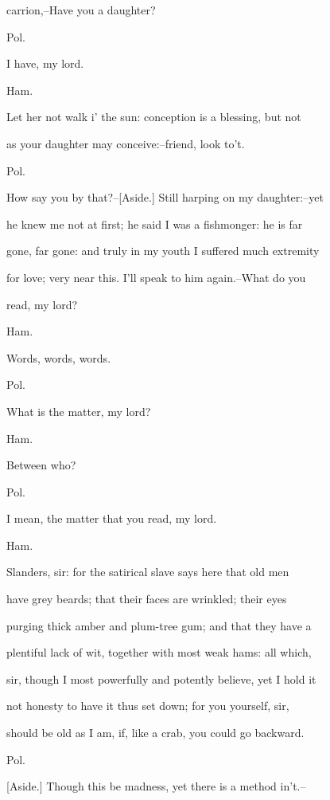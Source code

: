 \documentclass[12pt]{book}
\begin{document}
carrion,--Have you a daughter?



Pol.

I have, my lord.



Ham.

Let her not walk i' the sun: conception is a blessing, but not

as your daughter may conceive:--friend, look to't.



Pol.

How say you by that?--[Aside.] Still harping on my daughter:--yet

he knew me not at first; he said I was a fishmonger: he is far

gone, far gone: and truly in my youth I suffered much extremity

for love; very near this. I'll speak to him again.--What do you

read, my lord?



Ham.

Words, words, words.



Pol.

What is the matter, my lord?



Ham.

Between who?



Pol.

I mean, the matter that you read, my lord.



Ham.

Slanders, sir: for the satirical slave says here that old men

have grey beards; that their faces are wrinkled; their eyes

purging thick amber and plum-tree gum; and that they have a

plentiful lack of wit, together with most weak hams: all which,

sir, though I most powerfully and potently believe, yet I hold it

not honesty to have it thus set down; for you yourself, sir,

should be old as I am, if, like a crab, you could go backward.



Pol.

[Aside.] Though this be madness, yet there is a method in't.--
\end{document}
